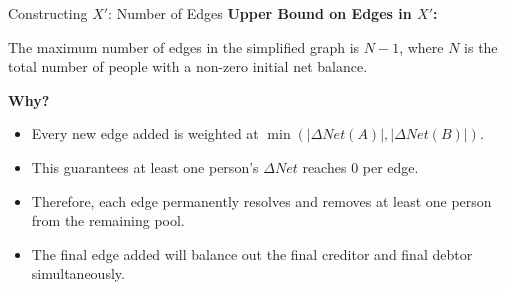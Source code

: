 \documentclass{beamer}
\begin{document}
\begin{frame}{Constructing $X'$: Number of Edges}
    \textbf{Upper Bound on Edges in $X'$:}

    \vspace{0.2cm}
    The maximum number of edges in the simplified graph is \textbf{$N - 1$}, where $N$ is the total number of people with a non-zero initial net balance.

    \vspace{0.5cm}
    \textbf{Why?}
    \begin{itemize}
        \item Every new edge added is weighted at $\min(|\Delta Net(A)|, |\Delta Net(B)|)$.
        \item This guarantees at least one person's $\Delta Net$ reaches $0$ per edge.
        \item Therefore, each edge permanently resolves and removes at least one person from the remaining pool.
        \item The final edge added will balance out the final creditor and final debtor simultaneously.
    \end{itemize}
\end{frame}
\end{document}
